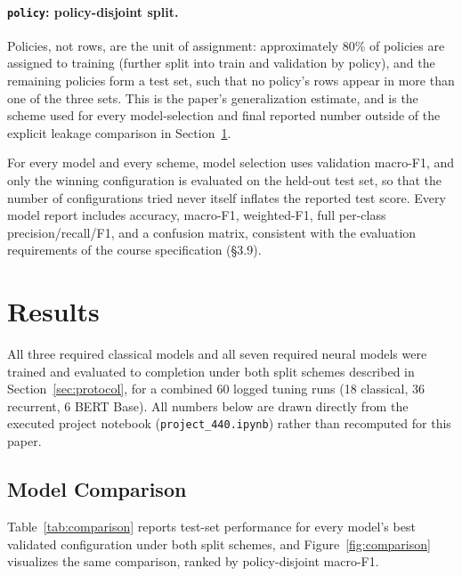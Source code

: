 \documentclass[11pt]{acl}
\begin{document}
\paragraph{\texttt{policy}: policy-disjoint split.} Policies, not rows, are the unit of
assignment: approximately 80\% of policies are assigned to training (further split into
train and validation by policy), and the remaining policies form a test set, such that
no policy's rows appear in more than one of the three sets. This is the paper's
generalization estimate, and is the scheme used for every model-selection and final
reported number outside of the explicit leakage comparison in
Section~\ref{sec:results}.

For every model and every scheme, model selection uses validation macro-F1, and only
the winning configuration is evaluated on the held-out test set, so that the number of
configurations tried never itself inflates the reported test score. Every model report
includes accuracy, macro-F1, weighted-F1, full per-class precision/recall/F1, and a
confusion matrix, consistent with the evaluation requirements of the course
specification (\S3.9).

\section{Results}
\label{sec:results}

All three required classical models and all seven required neural models were trained
and evaluated to completion under both split schemes described in
Section~\ref{sec:protocol}, for a combined 60 logged tuning runs (18 classical, 36
recurrent, 6 BERT Base). All numbers below are drawn directly from the executed project
notebook (\texttt{project\_440.ipynb}) rather than recomputed for this paper.

\subsection{Model Comparison}
\label{sec:model-comparison}

Table~\ref{tab:comparison} reports test-set performance for every model's
best validated configuration under both split schemes, and
Figure~\ref{fig:comparison} visualizes the same comparison, ranked by policy-disjoint
macro-F1.
\end{document}
